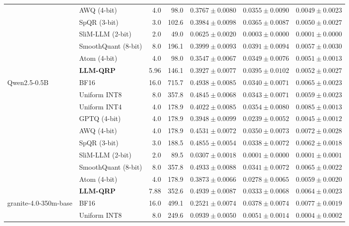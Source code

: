 \begin{table}[htbp]
\begin{tabular}{llrrrrr}
     & AWQ (4-bit) & 4.0 & 98.0 & $0.3767 \pm 0.0080$ & $0.0355 \pm 0.0090$ & $0.0049 \pm 0.0023$ \\
     & SpQR (3-bit) & 3.0 & 102.6 & $0.3984 \pm 0.0098$ & $0.0365 \pm 0.0087$ & $0.0050 \pm 0.0027$ \\
     & SliM-LLM (2-bit) & 2.0 & 49.0 & $0.0625 \pm 0.0020$ & $0.0003 \pm 0.0000$ & $0.0001 \pm 0.0000$ \\
     & SmoothQuant (8-bit) & 8.0 & 196.1 & $0.3999 \pm 0.0093$ & $0.0391 \pm 0.0094$ & \textbf{$0.0057 \pm 0.0030$} \\
     & Atom (4-bit) & 4.0 & 98.0 & $0.3547 \pm 0.0067$ & $0.0349 \pm 0.0076$ & $0.0051 \pm 0.0013$ \\
     & \textbf{LLM-QRP} & 5.96 & 146.1 & $0.3927 \pm 0.0077$ & \textbf{$0.0395 \pm 0.0102$} & $0.0052 \pm 0.0027$ \\
    \midrule
    Qwen2.5-0.5B & BF16 & 16.0 & 715.7 & $0.4938 \pm 0.0085$ & $0.0340 \pm 0.0071$ & $0.0065 \pm 0.0023$ \\
     & Uniform INT8 & 8.0 & 357.8 & $0.4845 \pm 0.0068$ & $0.0343 \pm 0.0071$ & $0.0059 \pm 0.0023$ \\
     & Uniform INT4 & 4.0 & 178.9 & $0.4022 \pm 0.0085$ & \textbf{$0.0354 \pm 0.0080$} & \textbf{$0.0085 \pm 0.0013$} \\
     & GPTQ (4-bit) & 4.0 & 178.9 & $0.3948 \pm 0.0099$ & $0.0239 \pm 0.0052$ & $0.0045 \pm 0.0012$ \\
     & AWQ (4-bit) & 4.0 & 178.9 & $0.4531 \pm 0.0072$ & $0.0350 \pm 0.0073$ & $0.0072 \pm 0.0028$ \\
     & SpQR (3-bit) & 3.0 & 188.5 & $0.4855 \pm 0.0054$ & $0.0338 \pm 0.0072$ & $0.0062 \pm 0.0018$ \\
     & SliM-LLM (2-bit) & 2.0 & 89.5 & $0.0307 \pm 0.0018$ & $0.0001 \pm 0.0000$ & $0.0001 \pm 0.0001$ \\
     & SmoothQuant (8-bit) & 8.0 & 357.8 & $0.4933 \pm 0.0088$ & $0.0341 \pm 0.0072$ & $0.0065 \pm 0.0022$ \\
     & Atom (4-bit) & 4.0 & 178.9 & $0.3873 \pm 0.0066$ & $0.0278 \pm 0.0065$ & $0.0059 \pm 0.0020$ \\
     & \textbf{LLM-QRP} & 7.88 & 352.6 & \textbf{$0.4939 \pm 0.0087$} & $0.0333 \pm 0.0068$ & $0.0064 \pm 0.0023$ \\
    \midrule
    granite-4.0-350m-base & BF16 & 16.0 & 499.1 & $0.2521 \pm 0.0074$ & $0.0378 \pm 0.0074$ & $0.0077 \pm 0.0019$ \\
     & Uniform INT8 & 8.0 & 249.6 & $0.0939 \pm 0.0050$ & $0.0051 \pm 0.0014$ & $0.0004 \pm 0.0002$ \\

\end{tabular}
\end{table}
